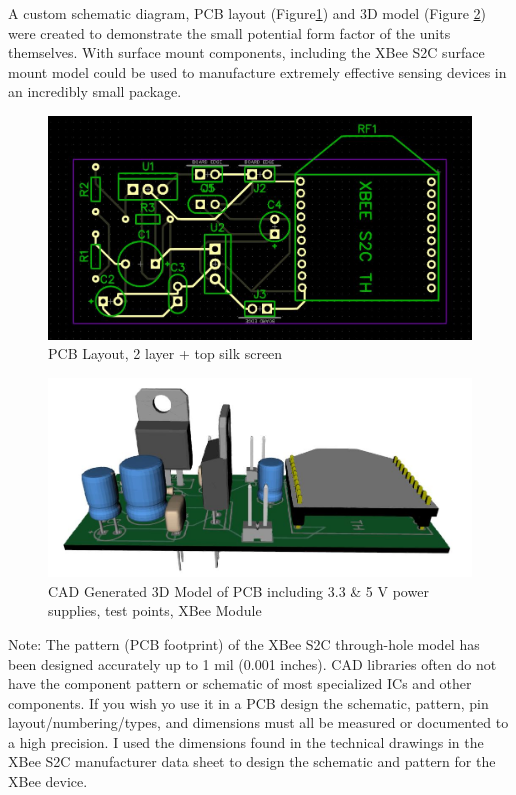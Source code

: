 	\par A custom schematic diagram, PCB layout (Figure\ref{fig:pcb}) and 3D model (Figure \ref{fig:3dmodel}) were created to demonstrate the small potential form factor of the units themselves. With surface mount components, including the XBee S2C surface mount model could be used to manufacture extremely effective sensing devices in an incredibly small package.
	\onecolumn
	\begin{figure}[h]
		\centering
		\includegraphics[width=0.75\linewidth]{power supply pcb w xbee.JPG}
		\caption{PCB Layout, 2 layer + top silk screen}
		\label{fig:pcb}
	\end{figure}
	\begin{figure}[h]
	\centering
		\includegraphics[width=0.75\linewidth]{3dmodel.JPG}
		\caption{CAD Generated 3D Model of PCB including 3.3 \& 5 V power supplies, test points, XBee Module}
		\label{fig:3dmodel}
	\end{figure}
	
	\par Note: The pattern (PCB footprint) of the XBee S2C through-hole model has been designed accurately up to 1 mil (0.001 inches). CAD libraries often do not have the component pattern or schematic of most specialized ICs and other components. If you wish yo use it in a PCB design the schematic, pattern, pin layout/numbering/types, and dimensions must all be measured or documented to a high precision. I used the dimensions found in the technical drawings in the XBee S2C manufacturer data sheet to design the schematic and pattern for the XBee device. 

	\twocolumn
	
	